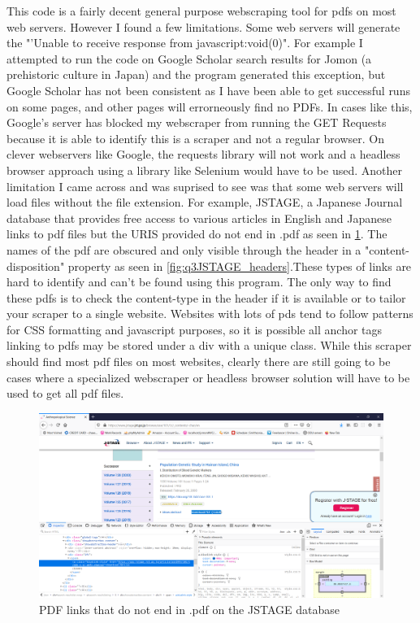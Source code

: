 \documentclass[12pt]{article}
\begin{document}
This code is a fairly decent general purpose webscraping tool for pdfs on most web servers. However I found a few limitations. Some web servers will generate the "'Unable to receive response from  javascript:void(0)". For example I attempted to run the code on Google Scholar search results for Jomon (a prehistoric culture in Japan) \cite{googleScholarJomon} and the program generated this exception, but Google Scholar has not been consistent as I have been able to get successful runs on some pages, and other pages will errorneously find no PDFs. In cases like this, Google's server has blocked my webscraper from running the GET Requests because it is able to identify this is a scraper and not a regular browser. On clever webservers like Google, the requests library will not work and a headless browser approach using a library like Selenium would have to be used. Another limitation I came across and was suprised to see was that some web servers will load files without the file extension. For example, JSTAGE, a Japanese Journal database that provides free access to various articles in English and Japanese links to pdf files but the URIS provided do not end in .pdf as seen in \ref{fig:q3JSTAGE_pdfs}. The names of the pdf are obscured and only visible through the header in a "content-disposition" property as seen in \ref{fig:q3JSTAGE_headers}.These types of links are hard to identify and can't be found using this program. The only way to find these pdfs is to check the content-type in the header if it is available or to tailor your scraper to a single website. Websites with lots of pds tend to follow patterns for CSS formatting and javascript purposes, so it is possible all anchor tags linking to pdfs may be stored under a div with a unique class. While this scraper should find most pdf files on most websites, clearly there are still going to be cases where a specialized webscraper or headless browser solution will have to be used to get all pdf files. 

\begin{figure}[H]
    \centering
    \includegraphics[trim=0 60 10 20, clip, width=\textwidth] {Q3/jstage_missingExtension.png}
    \caption{PDF links that do not end in .pdf on the JSTAGE database}
    \label{fig:q3JSTAGE_pdfs}
\end{figure}
\end{document}
